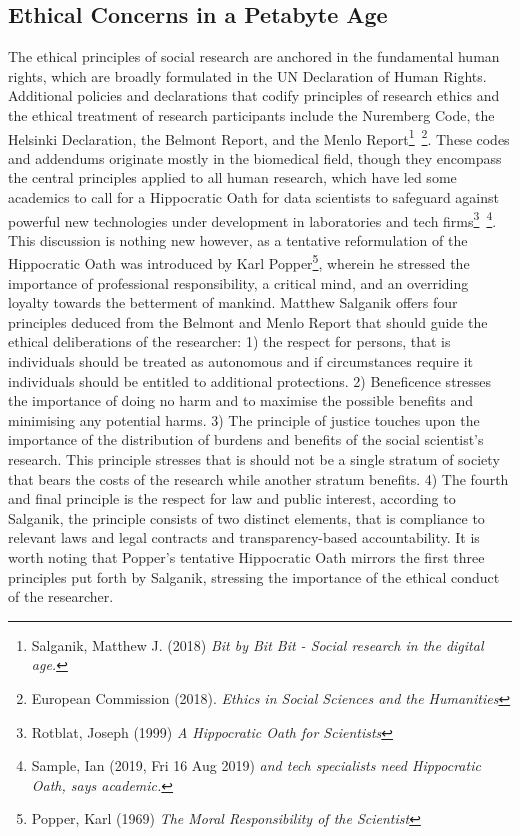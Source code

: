 \documentclass[12pt,a4paper]{article}
\begin{document}
\subsection{Ethical Concerns in a Petabyte Age}
The ethical principles of social research are anchored in the fundamental human rights, which are broadly formulated in the UN Declaration of Human Rights. Additional policies and declarations that codify principles of research ethics and the ethical treatment of research participants include the Nuremberg Code, the Helsinki Declaration, the Belmont Report, and the Menlo Report\footnote{Salganik, Matthew J. (2018) \textit{Bit by Bit Bit - Social research in the digital age.}}\, \footnote{European Commission (2018). \textit{Ethics in Social Sciences and the Humanities}}. These codes and addendums originate mostly in the biomedical field, though they encompass the central principles applied to all human research, which have led some academics to call for a Hippocratic Oath for data scientists to safeguard against powerful new technologies under development in laboratories and tech firms\footnote{Rotblat, Joseph (1999) \textit{A Hippocratic Oath for Scientists}}\, \footnote{Sample, Ian (2019, Fri 16 Aug 2019) \textit{and tech specialists need Hippocratic Oath, says academic.}}. This discussion is nothing new however, as a tentative reformulation of the Hippocratic Oath was introduced by Karl Popper\footnote{Popper, Karl (1969) \textit{The Moral Responsibility of the Scientist}}, wherein he stressed the importance of professional responsibility, a critical mind, and an overriding loyalty towards the betterment of mankind.\newline
Matthew Salganik offers four principles deduced from the Belmont and Menlo Report that should guide the ethical deliberations of the researcher: 1) the respect for persons, that is individuals should be treated as autonomous and if circumstances require it individuals should be entitled to additional protections. 2) Beneficence stresses the importance of doing no harm and to maximise the possible benefits and minimising any potential harms. 3) The principle of justice touches upon the importance of the distribution of burdens and benefits of the social scientist's research. This principle stresses that is should not be a single stratum of society that bears the costs of the research while another stratum benefits. 4) The fourth and final principle is the respect for law and public interest, according to Salganik, the principle consists of two distinct elements, that is compliance to relevant laws and legal contracts and transparency-based accountability. It is worth noting that Popper’s tentative Hippocratic Oath mirrors the first three principles put forth by Salganik, stressing the importance of the ethical conduct of the researcher.\newline
\end{document}
